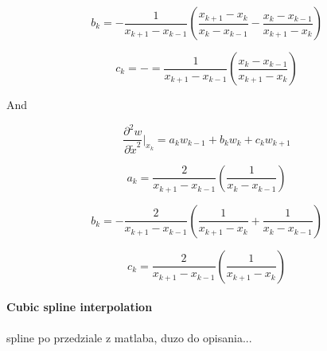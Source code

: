\begin{equation}
b_k=-\frac{1}{x_{k+1}-x_{k-1}}\left(\frac{x_{k+1}-x_{k}}{x_{k}-x_{k-1}}-\frac{x_k-x_{k-1}}{x_{k+1}-x_k}\right)
\end{equation}

\begin{equation}
c_k=-=\frac{1}{x_{k+1}-x_{k-1}}\left(\frac{x_k-x_{k-1}}{x_{k+1}-x_k}\right)
\end{equation}

And

\begin{equation}
\frac{\partial^2 w}{\partial \tilde x^2}|_{x_k}=a_k w_{k-1}+b_k w_{k}+c_k w_{k+1}
\end{equation}

\begin{equation}
a_k=\frac{2}{x_{k+1}-x_{k-1}}\left(\frac{1}{x_{k}-x_{k-1}}\right)
\end{equation}

\begin{equation}
b_k=-\frac{2}{x_{k+1}-x_{k-1}}\left(\frac{1}{x_{k+1}-x_{k}}+\frac{1}{x_{k}-x_{k-1}}\right)
\end{equation}

\begin{equation}
c_k=\frac{2}{x_{k+1}-x_{k-1}}\left(\frac{1}{x_{k+1}-x_{k}}\right)
\end{equation}

\paragraph{Cubic spline interpolation}

spline po przedziale z matlaba, duzo do opisania...

